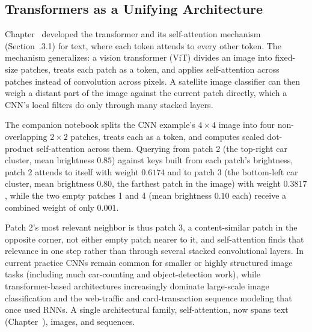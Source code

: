 \documentclass[../ai_in_finance]{subfiles}
\begin{document}
\subsection{Transformers as a Unifying Architecture}
\label{sec:vision-transformer}

Chapter~ developed the transformer and its self-attention mechanism (Section~.3.1) for text, where each token attends to every other token. The mechanism generalizes: a vision transformer (ViT) divides an image into fixed-size patches, treats each patch as a token, and applies self-attention across patches instead of convolution across pixels. A satellite image classifier can then weigh a distant part of the image against the current patch directly, which a CNN's local filters do only through many stacked layers.

The companion notebook splits the CNN example's $4\times4$ image into four non-overlapping $2\times2$ patches, treats each as a token, and computes scaled dot-product self-attention across them. Querying from patch 2 (the top-right car cluster, mean brightness $0.85$) against keys built from each patch's brightness, patch 2 attends to itself with weight $0.6174$ and to patch 3 (the bottom-left car cluster, mean brightness $0.80$, the farthest patch in the image) with weight $0.3817$, while the two empty patches 1 and 4 (mean brightness $0.10$ each) receive a combined weight of only $0.001$.

Patch 2's most relevant neighbor is thus patch 3, a content-similar patch in the opposite corner, not either empty patch nearer to it, and self-attention finds that relevance in one step rather than through several stacked convolutional layers. In current practice CNNs remain common for smaller or highly structured image tasks (including much car-counting and object-detection work), while transformer-based architectures increasingly dominate large-scale image classification and the web-traffic and card-transaction sequence modeling that once used RNNs. A single architectural family, self-attention, now spans text (Chapter~), images, and sequences.
\end{document}

